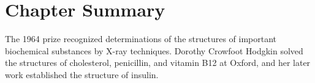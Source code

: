 \clearpage

\section*{Chapter Summary}

The 1964 prize recognized determinations of the structures of important biochemical substances by X-ray techniques. Dorothy Crowfoot Hodgkin solved the structures of cholesterol, penicillin, and vitamin B12 at Oxford, and her later work established the structure of insulin.

